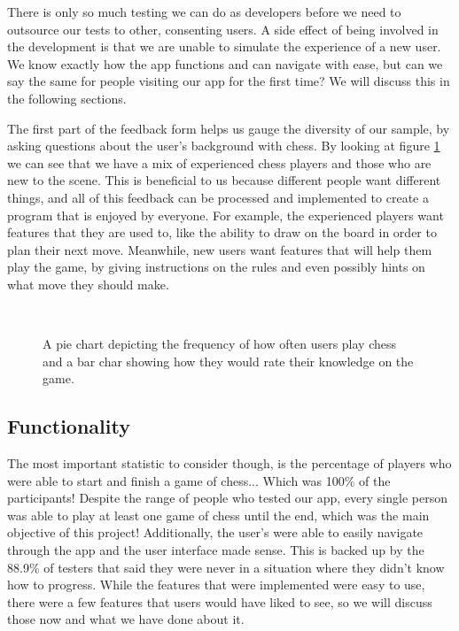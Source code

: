 There is only so much testing we can do as developers before we need to outsource our tests to other, consenting users. A side effect of being involved in the development is that we are unable to simulate the experience of a new user. We know exactly how the app functions and can navigate with ease, but can we say the same for people visiting our app for the first time? We will discuss this in the following sections.

The first part of the feedback form helps us gauge the diversity of our sample, by asking questions about the user's background with chess. By looking at figure \ref{StatDiversity} we can see that we have a mix of experienced chess players and those who are new to the scene. This is beneficial to us because different people want different things, and all of this feedback can be processed and implemented to create a program that is enjoyed by everyone. For example, the experienced players want features that they are used to, like the ability to draw on the board in order to plan their next move. Meanwhile, new users want features that will help them play the game, by giving instructions on the rules and even possibly hints on what move they should make. 

\begin{figure}
    \begin{center}
         \\
        \vspace{1cm}
        \caption{A pie chart depicting the frequency of how often users play chess and a bar char showing how they would rate their knowledge on the game.}
        \label{StatDiversity}
    \end{center}
\end{figure}

\subsection{Functionality}

The most important statistic to consider though, is the percentage of players who were able to start and finish a game of chess... Which was 100\% of the participants! Despite the range of people who tested our app, every single person was able to play at least one game of chess until the end, which was the main objective of this project! Additionally, the user's were able to easily navigate through the app and the user interface made sense. This is backed up by the 88.9\% of testers that said they were never in a situation where they didn't know how to progress. While the features that were implemented were easy to use, there were a few features that users would have liked to see, so we will discuss those now and what we have done about it.

